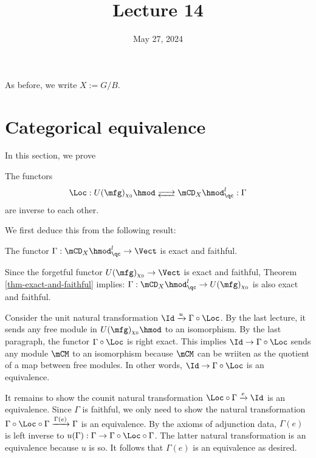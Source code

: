 





\title{Lecture 14}

\date{May 27, 2024}

\maketitle

	As before, we write $X:=G/B$.

\section{Categorical equivalence}

	In this section, we prove
	\begin{thm} \label{thm-categorical-equivalence}
		The functors
		\[
			\Loc: U(\mfg)_{\chi_0} \hmod \adj \mCD_X \hmod_\qc^l: \Gamma
		\]
		are inverse to each other. 
	\end{thm}
		
	We first deduce this from the following result:

	\begin{thm}
		\label{thm-exact-and-faithful}
		The functor $\Gamma: \mCD_X \hmod_\qc^l \to \Vect$ is exact and faithful.
	\end{thm}


		Since the forgetful functor $U(\mfg)_{\chi_0} \to \Vect$ is exact and faithful, Theorem \ref{thm-exact-and-faithful} implies: $\Gamma: \mCD_X \hmod_\qc^l \to  U(\mfg)_{\chi_0} $ is also exact and faithful.

		Consider the unit natural transformation $\Id \xrightarrow{u} \Gamma \circ \Loc$. By the last lecture, it sends any free module in $U(\mfg)_{\chi_0} \hmod$ to an isomorphism. By the last paragraph, the functor $\Gamma \circ \Loc$ is right exact. This implies $\Id \to \Gamma \circ \Loc$ sends any module $\mCM$ to an isomorphism because $\mCM$ can be wriiten as the quotient of a map between free modules. In other words, $\Id \to \Gamma \circ \Loc$ is an equivalence.

		It remains to show the counit natural transformation $\Loc\circ \Gamma \xrightarrow{e} \Id$ is an equivalence. Since $\Gamma$ is faithful, we only need to show the natural transformation $\Gamma\circ \Loc \circ \Gamma \xrightarrow{\Gamma(e)} \Gamma$ is an equivalence. By the axioms of adjunction data, $\Gamma(e)$ is left inverse to $u(\Gamma): \Gamma \to \Gamma\circ \Loc \circ \Gamma$. The latter natural transformation is an equivalence because $u$ is so. It follows that $\Gamma(e)$ is an equivalence as desired.

